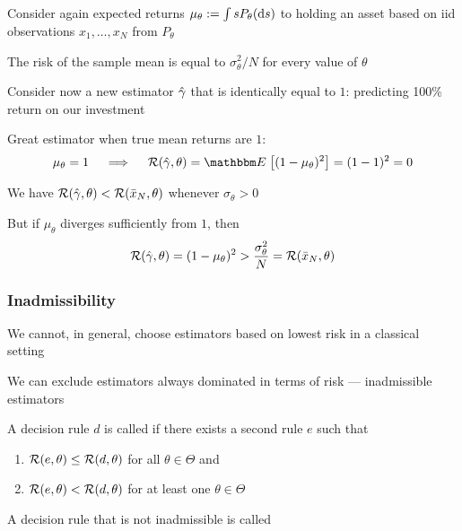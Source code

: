 \begin{frame}

    \vspace{2em}
    \Eg
    Consider again expected returns $\mu_\theta :=
    \int s P_\theta(\mathop{}\!\mathrm{d} s)$ to holding an asset based on {\sc iid}
    observations $x_1, \ldots, x_N$ from $P_\theta$
    
    The risk of the
    sample mean is equal to $\sigma_\theta^2/N$ for every value
    of $\theta$
    
    Consider now a new estimator $\hat \gamma$ that is identically
    equal to $1$:  predicting 100\% return on our
    investment
    
    Great estimator when true mean returns are $1$:
    \begin{equation*}
        \mu_\theta = 1
        \quad \implies \quad
        \risk(\hgamma, \theta) 
        = \EE \left[  (1 - \mu_\theta)^2 \right] 
        =   (1 - 1)^2  
        = 0
    \end{equation*}
    
    We have $\mathcal R(\hat \gamma, \theta) <
    \mathcal R(\bar x_N, \theta)$ whenever $\sigma_\theta > 0$
    
\end{frame}

\begin{frame}
    \vspace{2em}
    But
    if $\mu_\theta$ diverges sufficiently from $1$, then
    \begin{equation*}
        \mathcal R(\hat \gamma, \theta) 
        =   (1 - \mu_\theta)^2
        >  \frac{\sigma_\theta^2}{N} 
        = \mathcal R(\bar x_N, \theta)
    \end{equation*}
\end{frame}

\begin{frame}\frametitle{Inadmissibility}

    \vspace{2em}
    We cannot, in general, choose estimators
    based on lowest risk in a classical setting
    
    We can exclude estimators always dominated in terms of risk --- inadmissible estimators
    
    \vspace{.7em}
    A decision
    rule $d$ is called  if
    there exists a second rule $e$ such that 
    \begin{enumerate}
        \item $\mathcal R(e, \theta) \leq \mathcal R(d, \theta)$ for all $\theta \in
            \Theta$ and
        \item $\mathcal R(e, \theta) < \mathcal R(d, \theta)$ for at least one $\theta \in
            \Theta$
    \end{enumerate}
    
    A decision rule that is not inadmissible is called 
    
\end{frame}

